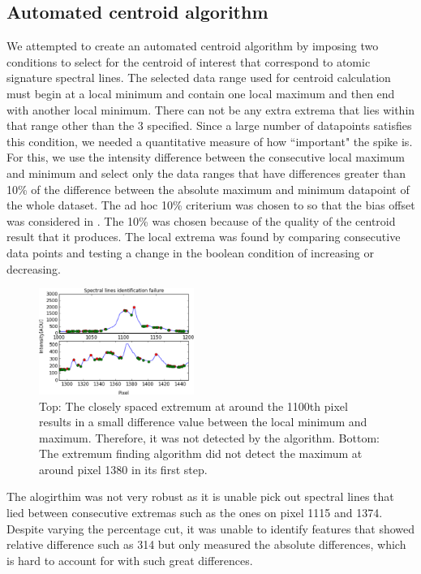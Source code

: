 \documentclass[authoryear, 12pt,5p, times]{elsarticle}
\begin{document}
	\subsection{Automated centroid algorithm}
	We attempted to create an automated centroid algorithm by imposing two conditions to select for the centroid of interest that correspond to atomic signature spectral lines. The selected data range used for centroid calculation must begin at a local minimum and contain one local maximum and then end with another local minimum. There can not be any extra extrema that lies within that range other than the 3 specified. Since a large number of datapoints satisfies this condition, we needed a quantitative measure of how ``important" the spike is.  For this, we use the intensity difference between the consecutive  local maximum and minimum and select only the data ranges that  have  differences greater than 10\% of the difference between the absolute maximum and  minimum datapoint of the whole dataset. The ad hoc 10\% criterium was chosen to so that the bias offset  was considered in . The 10\% was chosen because of the quality of the centroid result that it produces. The local extrema was found by comparing consecutive data points and testing a change in the boolean condition of increasing or decreasing.
\begin{figure}
\includegraphics[width=0.45\textwidth]{figures/fail}
\caption{Top: The closely spaced extremum at around the 1100th pixel results in a small difference value between the local minimum and maximum. Therefore, it was not detected by the algorithm. Bottom: The extremum finding algorithm did not detect the maximum at around pixel 1380 in its  first step.}
\end{figure}
	The alogirthim was not very robust as it is unable pick out spectral lines that lied between consecutive extremas such as the ones on pixel 1115 and 1374. Despite varying the percentage cut, it was unable to identify features that showed relative difference such as 314 but only measured the absolute differences, which is hard to account for with such great differences.
\end{document}
